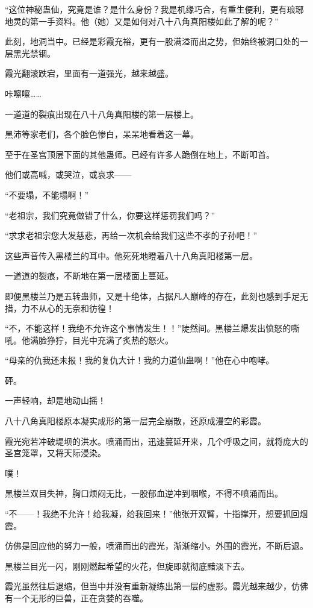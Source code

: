 \begin{this_body}
“这位神秘蛊仙，究竟是谁？是什么身份？我是机缘巧合，有重生便利，更有琅琊地灵的第一手资料。他（她）又是如何对八十八角真阳楼如此了解的呢？”

此刻，地洞当中。已经是彩霞充裕，更有一股满溢而出之势，但始终被洞口处的一层黑光禁锢。

霞光翻滚跌宕，里面有一道强光，越来越盛。

咔嚓嚓……

一道道的裂痕出现在八十八角真阳楼的第一层楼上。

黑沛等家老们，各个脸色惨白，呆呆地看着这一幕。

至于在圣宫顶层下面的其他蛊师。已经有许多人跪倒在地上，不断叩首。

他们或高喊，或哭泣，或哀求——

“不要塌，不能塌啊！”

“老祖宗，我们究竟做错了什么，你要这样惩罚我们吗？”

“求求老祖宗您大发慈悲，再给一次机会给我们这些不孝的子孙吧！”

这些声音传入黑楼兰的耳中。他死死地瞪着八十八角真阳楼第一层。

一道道的裂痕，不断地在第一层楼面上蔓延。

即便黑楼兰乃是五转蛊师，又是十绝体，占据凡人巅峰的存在，此刻也感到手足无措，力不从心的无奈和彷徨！

“不，不能这样！我绝不允许这个事情发生！！”陡然间。黑楼兰爆发出愤怒的嘶吼。他满脸狰狞，目光中充满了炙热的怒火。

“母亲的仇我还未报！我的复仇大计！我的力道仙蛊啊！”他在心中咆哮。

砰。

一声轻响，却是地动山摇！

八十八角真阳楼原本凝实成形的第一层完全崩散，还原成漫空的彩霞。

霞光宛若冲破堤坝的洪水。喷涌而出，迅速蔓延开来，几个呼吸之间，就将庞大的圣宫笼罩，又将天际浸染。

噗！

黑楼兰双目失神，胸口烦闷无比，一股郁血逆冲到咽喉，不得不喷涌而出。

“不——！我绝不允许！给我凝，给我回来！”他张开双臂，十指撑开，想要抓回烟霞。

仿佛是回应他的努力一般，喷涌而出的霞光，渐渐缩小。外围的霞光，不断后退。

黑楼兰目光一闪，刚刚燃起希望的火花，但旋即就彻底黯淡下去。

霞光虽然往后退缩，但当中并没有重新凝练出第一层的虚影。霞光越来越少，仿佛有一个无形的巨兽，正在贪婪的吞噬。


\end{this_body}
